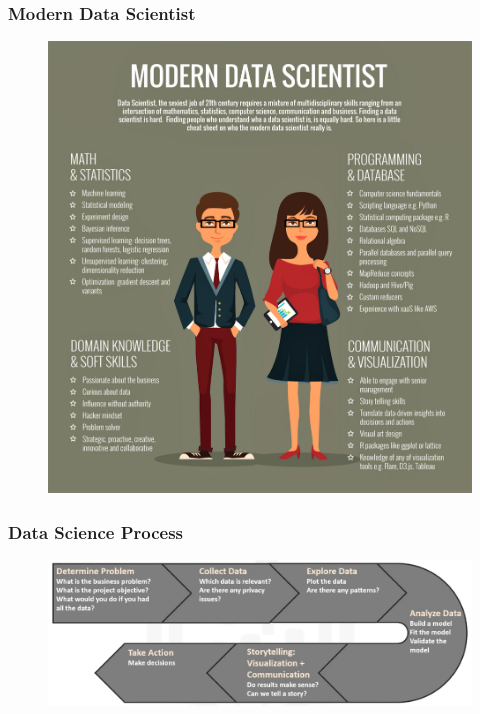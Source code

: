 \documentclass{beamer}
\begin{document}
\begin{frame}
\frametitle{Modern Data Scientist }
\begin{figure}
\includegraphics[scale=0.20]{img/3_DataScientist_Skill_2}
\end{figure}
\end{frame}

\begin{frame}
\frametitle{Data Science Process }
\begin{figure}
\includegraphics[scale=0.30]{img/3_DataScience_Process}
\end{figure}
\end{frame}
\end{document}
